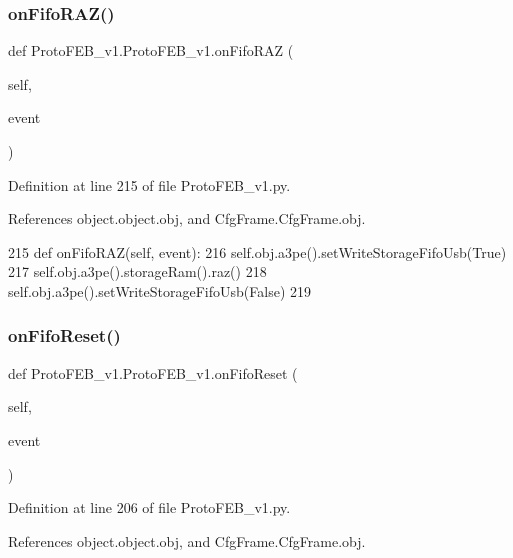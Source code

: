 \subsubsection{\texorpdfstring{on\+Fifo\+R\+A\+Z()}{onFifoRAZ()}}
{\footnotesize\ttfamily def Proto\+F\+E\+B\+\_\+v1.\+Proto\+F\+E\+B\+\_\+v1.\+on\+Fifo\+R\+AZ (\begin{DoxyParamCaption}\item[{}]{self,  }\item[{}]{event }\end{DoxyParamCaption})}



Definition at line 215 of file Proto\+F\+E\+B\+\_\+v1.\+py.



References object.\+object.\+obj, and Cfg\+Frame.\+Cfg\+Frame.\+obj.


\begin{DoxyCode}
215     \textcolor{keyword}{def }onFifoRAZ(self, event):
216         self.obj.a3pe().setWriteStorageFifoUsb(\textcolor{keyword}{True})
217         self.obj.a3pe().storageRam().raz()
218         self.obj.a3pe().setWriteStorageFifoUsb(\textcolor{keyword}{False})
219 
\end{DoxyCode}
\mbox{\label{classProtoFEB__v1_1_1ProtoFEB__v1_aa63a526f65c5a13a99d56c89bcb4c7f7}} 
\subsubsection{\texorpdfstring{on\+Fifo\+Reset()}{onFifoReset()}}
{\footnotesize\ttfamily def Proto\+F\+E\+B\+\_\+v1.\+Proto\+F\+E\+B\+\_\+v1.\+on\+Fifo\+Reset (\begin{DoxyParamCaption}\item[{}]{self,  }\item[{}]{event }\end{DoxyParamCaption})}



Definition at line 206 of file Proto\+F\+E\+B\+\_\+v1.\+py.



References object.\+object.\+obj, and Cfg\+Frame.\+Cfg\+Frame.\+obj.


